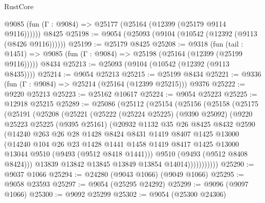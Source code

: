\begin{lexlean}{RustCore}
\begin{coremodule}
      @9085 (fun (Γ : @9084) => @25177 (@25164 (@12399 (@25179 @9114 @9116))))))
    @8425
@25198 := @9054 (@25093 (@9104 (@10542 (@12392 (@9113 (@8426 @9116))))))
@25199 := @25179 @8425
@25208 := @9318
    (fun (tail : @1451) => @9085 (fun (Γ : @9084) => @25198 (@25164 (@12399 (@25199 @9116)))))
    @8434
@25213 := @25093 (@9104 (@10542 (@12392 (@9113 @8435))))
@25214 := @9054 @25213
@25215 := @25199 @8434
@25221 := @9336 (fun (Γ : @9084) => @25214 (@25164 (@12399 @25215))) @9376
@25222 := @9220 @25213
@25223 := @25162 @10617
@25224 := @9054 @25223
@25225 := @12918 @25215
@25289 := @25086
    (@25112
      (@25154
        (@25156
          (@25158
            (@25175
              (@25191
                (@25208
                  (@25221
                    (@25222
                      (@25224 @25225)
                      (@9390 @25092)
                      (@9220
                        @25223
                        @25225
                        (@9395 @25161)
                        (@20932
                          @1132
                          @35
                          @26
                          @8425
                          @8432
                          @2590
                          (@14240
                            @263
                            @26
                            @28
                            @1428
                            @8424
                            @8431
                            @1419
                            @8407
                            @1425
                            @13000
                            (@14240
                              @104
                              @26
                              @23
                              @1428
                              @1441
                              @1458
                              @1419
                              @8417
                              @1425
                              @13000
                              @13044
                              @9510
                              (@9493 (@9512 @8418 @1441)))
                            @9510
                            (@9493 (@9512 @8408 @8424)))
                          @13839
                          @13842
                          @13845
                          @13849
                          @13854
                          @14014)))))))))))
@25290 := @9037 @1066
@25294 := @24280 (@9043 @1066) (@9049 @1066)
@25295 := @9058 @23593
@25297 := @9054 (@25295 @24292)
@25299 := @9096 (@9097 @1066)
@25300 := @9092 @25299
@25302 := @9054 (@25300 @24306)

\end{coremodule}
\end{lexlean}
